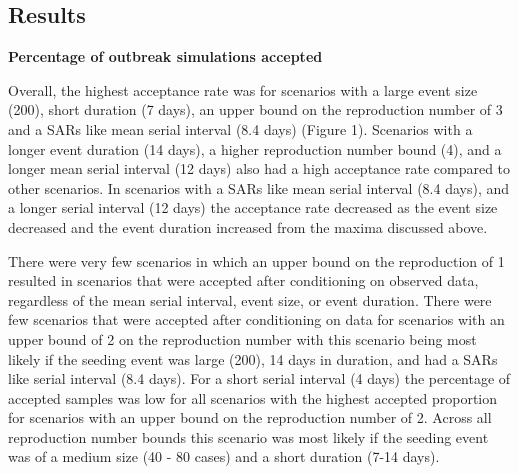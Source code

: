 \documentclass[]{article}
\begin{document}
\hypertarget{results}{%
\subsection{Results}\label{results}}

\textbf{Percentage of outbreak simulations accepted}

Overall, the highest acceptance rate was for scenarios with a large
event size (200), short duration (7 days), an upper bound on the
reproduction number of 3 and a SARs like mean serial interval (8.4 days)
(Figure 1). Scenarios with a longer event duration (14 days), a higher
reproduction number bound (4), and a longer mean serial interval (12
days) also had a high acceptance rate compared to other scenarios. In
scenarios with a SARs like mean serial interval (8.4 days), and a longer
serial interval (12 days) the acceptance rate decreased as the event
size decreased and the event duration increased from the maxima
discussed above.

There were very few scenarios in which an upper bound on the
reproduction of 1 resulted in scenarios that were accepted after
conditioning on observed data, regardless of the mean serial interval,
event size, or event duration. There were few scenarios that were
accepted after conditioning on data for scenarios with an upper bound of
2 on the reproduction number with this scenario being most likely if the
seeding event was large (200), 14 days in duration, and had a SARs like
serial interval (8.4 days). For a short serial interval (4 days) the
percentage of accepted samples was low for all scenarios with the
highest accepted proportion for scenarios with an upper bound on the
reproduction number of 2. Across all reproduction number bounds this
scenario was most likely if the seeding event was of a medium size (40 -
80 cases) and a short duration (7-14 days).
\end{document}
